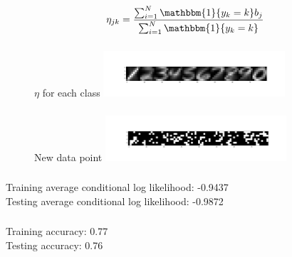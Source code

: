 \documentclass[12pt,letterpaper]{article} %
\newcommand{\switch}[0]{\mathbbm{1}\{y_k=k\}}
\begin{document}
\begin{equation*}
\eta_{jk} = \frac{\sum^N_{i=1}\switch{}b_j}{\sum^N_{i=1}\switch}
\end{equation*}

\subsubsection{}
 \begin{figure}[!h]
  \centering
  \caption{}{  $\eta$ for each class}
   \includegraphics[width=0.6\textwidth, trim={3in 0in 0in 0in},clip=true ]{q2_3_eta.png}
\end{figure}
\FloatBarrier



\subsubsection{}
 \begin{figure}[!h]
  \centering
  \caption{}{ New data point }
   \includegraphics[width=0.6\textwidth, trim={3in 0in 0in 0in},clip=true ]{q2_3_new.png}
\end{figure}
\FloatBarrier

\subsubsection{}
 Training average conditional log likelihood: -0.9437 \\
  Testing average conditional log likelihood: -0.9872\\
  \subsubsection{}
  Training accuracy: 0.77\\
  Testing accuracy: 0.76
 
\end{document}
